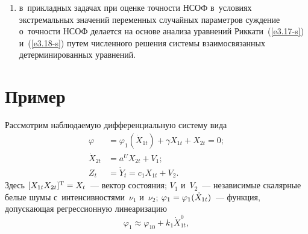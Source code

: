 \begin{multicols}{2}
\begin{enumerate}[(1)]
\item в~прикладных задачах при оценке точности НСОФ в~условиях экстремальных 
значений переменных случайных параметров суждение о~точности НСОФ делается на 
основе анализа уравнений Риккати~(\ref{e3.17-s}) и~(\ref{e3.18-s}) путем чис\-лен\-но\-го решения сис\-те\-мы 
взаимосвязанных детерминированных уравнений.
\end{enumerate}

\vspace*{-12pt}

\section{Пример}

 {Рассмотрим наблюдаемую дифференциальную систему вида
\begin{align}
\varphi &=\varphi_1 (\dot X_{1t}) + \gamma X_{1t} + X_{2t} =0;\label{e4.1-s}\\
\dot X_{2t} &= a^U X_{2t} + V_1;\label{e4.2-s}\\
Z_t&=\dot Y_t = c_1 X_{1t} + V_2.\label{e4.3-s}
\end{align}
Здесь $[X_{1t} X_{2t}]^{\mathrm{T}}\hm=X_t$~--- вектор состояния; $V_1$ и~$V_2$~--- независимые 
скалярные белые шумы с~интенсивностями~$\nu_1$ и~$\nu_2$; $\varphi_1 \hm=\varphi_1 (\dot 
X_{1t})$~--- функция, допускающая регрессионную линеаризацию}
 \begin{equation}
 \varphi_1 \approx \varphi_{10} + k_1 \dot X_{1t}^0,\label{e4.4-s}
 \end{equation}
 
 \pagebreak
 

\end{multicols}
